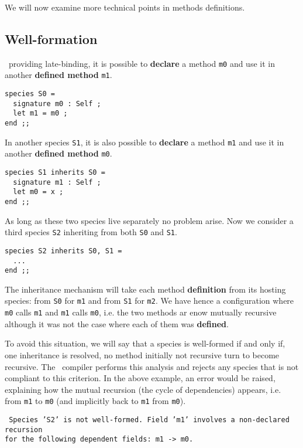 We will now examine more technical points in methods definitions.



\subsection{Well-formation}
\focal\ providing late-binding, it is possible to {\bf declare} a
method {\tt m0} and use it in another {\bf defined method} {\tt m1}.

{\scriptsize
\begin{lstlisting}
species S0 =
  signature m0 : Self ;
  let m1 = m0 ;
end ;;
\end{lstlisting}
}

In another species {\tt S1}, it is also possible to {\bf declare} a
method {\tt m1} and use it in another {\bf defined method} {\tt m0}.
{\scriptsize
\begin{lstlisting}
species S1 inherits S0 =
  signature m1 : Self ;
  let m0 = x ;
end ;;
\end{lstlisting}
}

As long as these two species live separately no problem arise. Now we
consider a third species {\tt S2} inheriting from both {\tt S0} and
{\tt S1}.
{\scriptsize
\begin{lstlisting}
species S2 inherits S0, S1 =
  ...
end ;;
\end{lstlisting}
}

The inheritance mechanism will take each method {\bf definition} from
its hosting species: from {\tt S0} for {\tt m1} and from {\tt S1} for
{\tt m2}. We have hence a configuration where {\tt m0} calls {\tt m1}
and {\tt m1} calls {\tt m0}, i.e. the two methods ar enow mutually
recursive although it was not the case where each of them was
{\bf defined}.

To avoid this situation, we will say that a species is well-formed if
and only if, one inheritance is resolved, no method initially not
recursive turn to become recursive. The \focal\ compiler performs this
analysis and rejects any species that is not compliant to this
criterion. In the above example, an error would be raised, explaining
how the mutual recursion (the cycle of dependencies) appears,
i.e. from {\tt m1} to {\tt m0} (and implicitly back to {\tt m1} from
{\tt m0}).

\noindent
{\scriptsize
{\tt
Species 'S2' is not well-formed. Field
'm1' involves a non-declared recursion\\
for the following dependent fields: m1 -> m0.
}
}



